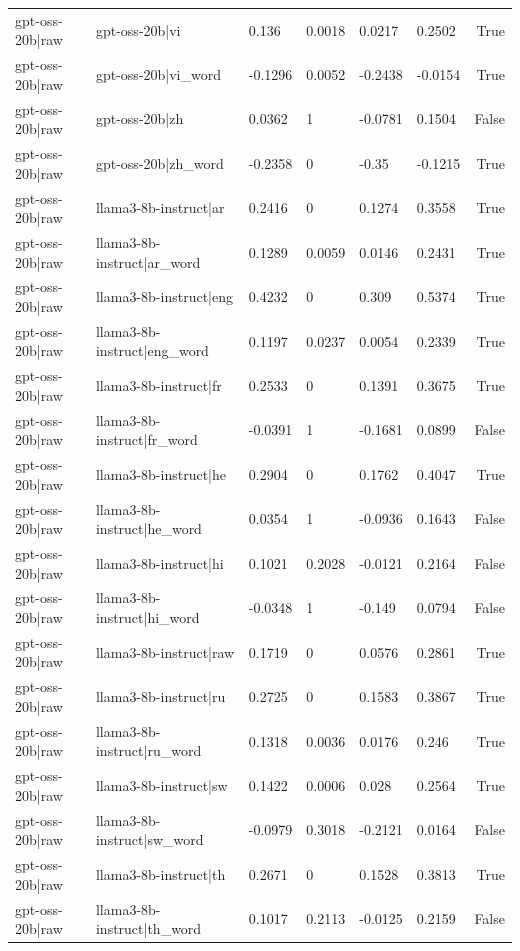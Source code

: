 \begin{table}
\begin{tabular}{llllllr}
gpt-oss-20b|raw & gpt-oss-20b|vi & 0.136 & 0.0018 & 0.0217 & 0.2502 & True \\
gpt-oss-20b|raw & gpt-oss-20b|vi_word & -0.1296 & 0.0052 & -0.2438 & -0.0154 & True \\
gpt-oss-20b|raw & gpt-oss-20b|zh & 0.0362 & 1 & -0.0781 & 0.1504 & False \\
gpt-oss-20b|raw & gpt-oss-20b|zh_word & -0.2358 & 0 & -0.35 & -0.1215 & True \\
gpt-oss-20b|raw & llama3-8b-instruct|ar & 0.2416 & 0 & 0.1274 & 0.3558 & True \\
gpt-oss-20b|raw & llama3-8b-instruct|ar_word & 0.1289 & 0.0059 & 0.0146 & 0.2431 & True \\
gpt-oss-20b|raw & llama3-8b-instruct|eng & 0.4232 & 0 & 0.309 & 0.5374 & True \\
gpt-oss-20b|raw & llama3-8b-instruct|eng_word & 0.1197 & 0.0237 & 0.0054 & 0.2339 & True \\
gpt-oss-20b|raw & llama3-8b-instruct|fr & 0.2533 & 0 & 0.1391 & 0.3675 & True \\
gpt-oss-20b|raw & llama3-8b-instruct|fr_word & -0.0391 & 1 & -0.1681 & 0.0899 & False \\
gpt-oss-20b|raw & llama3-8b-instruct|he & 0.2904 & 0 & 0.1762 & 0.4047 & True \\
gpt-oss-20b|raw & llama3-8b-instruct|he_word & 0.0354 & 1 & -0.0936 & 0.1643 & False \\
gpt-oss-20b|raw & llama3-8b-instruct|hi & 0.1021 & 0.2028 & -0.0121 & 0.2164 & False \\
gpt-oss-20b|raw & llama3-8b-instruct|hi_word & -0.0348 & 1 & -0.149 & 0.0794 & False \\
gpt-oss-20b|raw & llama3-8b-instruct|raw & 0.1719 & 0 & 0.0576 & 0.2861 & True \\
gpt-oss-20b|raw & llama3-8b-instruct|ru & 0.2725 & 0 & 0.1583 & 0.3867 & True \\
gpt-oss-20b|raw & llama3-8b-instruct|ru_word & 0.1318 & 0.0036 & 0.0176 & 0.246 & True \\
gpt-oss-20b|raw & llama3-8b-instruct|sw & 0.1422 & 0.0006 & 0.028 & 0.2564 & True \\
gpt-oss-20b|raw & llama3-8b-instruct|sw_word & -0.0979 & 0.3018 & -0.2121 & 0.0164 & False \\
gpt-oss-20b|raw & llama3-8b-instruct|th & 0.2671 & 0 & 0.1528 & 0.3813 & True \\
gpt-oss-20b|raw & llama3-8b-instruct|th_word & 0.1017 & 0.2113 & -0.0125 & 0.2159 & False \\

\end{tabular}
\end{table}
